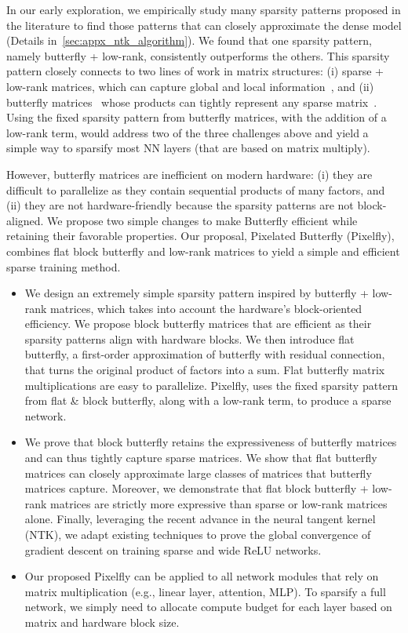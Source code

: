 In our early exploration, we empirically study many sparsity patterns proposed in the literature to find those patterns that can closely approximate the dense model (Details in~\ref{sec:appx_ntk_algorithm}). We found that one sparsity pattern, namely butterfly + low-rank, consistently outperforms the others. This sparsity pattern closely connects to two lines of work in matrix structures: (i) sparse + low-rank matrices, which can capture global and local information~\citep{candes2011robust,udell2019big, scatterbrain}, and (ii) butterfly matrices~\citep{parker1995random,dao2019learning} whose products can tightly represent any sparse matrix~\citep{desa2018two, dao2020kaleidoscope}. Using the fixed sparsity pattern from butterfly matrices, with the addition of a low-rank term, would address two of the three challenges above and yield a simple way to sparsify most NN layers (that are based on matrix multiply). 

However, butterfly matrices are inefficient on modern hardware: (i) they are difficult to parallelize as they contain sequential products of many factors, and (ii) they are not hardware-friendly because the sparsity patterns are not block-aligned. We propose two simple changes to make Butterfly efficient while retaining their favorable properties. Our proposal, Pixelated Butterfly (Pixelfly), combines flat block butterfly and low-rank matrices to yield a simple and efficient sparse training method.

\begin{itemize}[leftmargin=*,nosep,nolistsep]
\item We design an extremely simple sparsity pattern inspired by butterfly + low-rank matrices, which takes into account the hardware's block-oriented efficiency. We propose block butterfly matrices that are efficient as their sparsity patterns align with hardware blocks. We then introduce flat butterfly, a first-order approximation of butterfly with residual connection, that turns the original product of factors into a sum. Flat butterfly matrix multiplications are easy to parallelize. Pixelfly, uses the fixed sparsity pattern from flat \& block butterfly, along with a low-rank term, to produce a sparse network.
\item We prove that block butterfly retains the expressiveness of butterfly matrices and can thus tightly capture sparse matrices. We show that flat butterfly matrices can closely approximate large classes of matrices that butterfly matrices capture. Moreover, we demonstrate that flat block butterfly + low-rank matrices are strictly more expressive than sparse or low-rank matrices alone. Finally, leveraging the recent advance in the neural tangent kernel (NTK), we adapt existing techniques to prove the global convergence of gradient descent on training sparse and wide ReLU networks.
\item Our proposed Pixelfly can be applied to all network modules that rely on matrix multiplication (e.g., linear layer, attention, MLP). To sparsify a full network, we simply need to allocate compute budget for each layer based on matrix and hardware block size.
\end{itemize}

